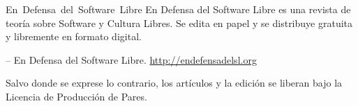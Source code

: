     \newpage
    \thispagestyle{empty}

    \begin{flushleft}\hbox{\Large{En Defensa del Software Libre}}
    En Defensa del Software Libre es una revista de teoría sobre Software y Cultura
    Libres. Se edita en papel y se distribuye gratuita y libremente en formato
    digital.

    \vfill
    \copyleft  \the\year -- En Defensa del Software Libre.
    \url{http://endefensadelsl.org}

    Salvo donde se exprese lo contrario, los artículos y la edición se
    liberan bajo la Licencia de Producción de Pares.

    \end{flushleft}
   \newpage


